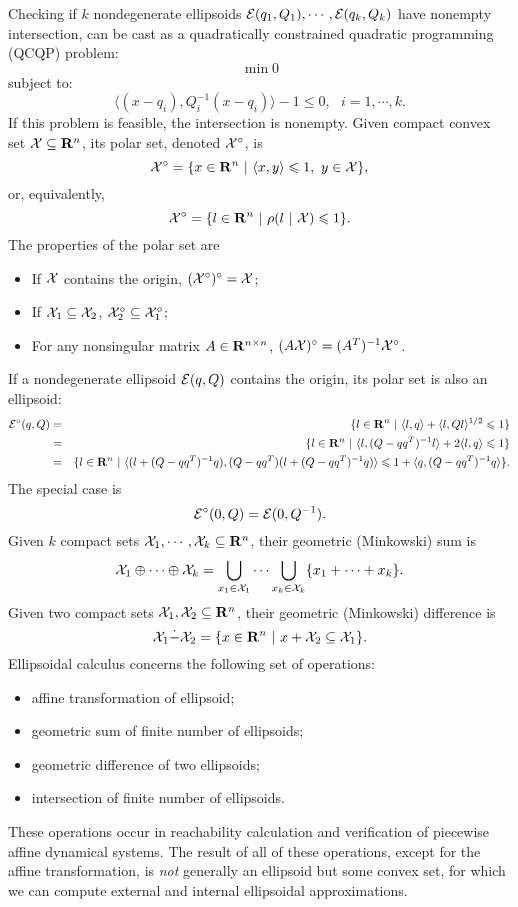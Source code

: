 Checking if $k$ nondegenerate ellipsoids $\EE(q_1,Q_1),\cdots,\EE(q_k,Q_k)$
have nonempty intersection, can be cast as a quadratically constrained
quadratic programming (QCQP) problem:
\[ \min 0 \]
subject to:
\[ \langle (x-q_i),Q_i^{-1}(x-q_i)\rangle - 1 \leq 0, ~~~ i=1,\cdots,k. \]
If this problem is feasible,  the intersection is nonempty.
\bd
Given compact convex set $\XX\subseteq{\bf R}^n$, its polar set, denoted
$\XX^\circ$, is
\[ \XX^\circ = \{x\in{\bf R}^n ~|~ \langle x,y\rangle\leq 1, ~ y\in\XX\}, \]
or, equivalently,
\[ \XX^\circ = \{l\in{\bf R}^n ~|~ \rho(l ~|~ \XX)\leq 1\}. \]
\ed
The properties of the polar set are
\begin{itemize}
\item If  $\XX$ contains the origin,  $(\XX^\circ)^\circ = \XX$;
\item If $\XX_1\subseteq\XX_2$,  $\XX_2^\circ\subseteq\XX_1^\circ$;
\item For any nonsingular matrix $A\in{\bf R}^{n\times n}$,
$(A\XX)^\circ = (A^T)^{-1}\XX^\circ$.
\end{itemize}
If a nondegenerate ellipsoid $\EE(q,Q)$ contains the origin,
 its polar set is also an ellipsoid:
\begin{eqnarray*}
\EE^\circ(q,Q) & = & \{l\in{\bf R}^n ~|~ \langle l,q\rangle +
\langle l,Ql\rangle^{1/2}\leq1 \}\\
& = & \{l\in{\bf R}^n ~|~ \langle l,(Q-qq^T)^{-1}l\rangle +
2\langle l,q\rangle\leq1 \}\\
& = & \{l\in{\bf R}^n ~|~ \langle(l+(Q-qq^T)^{-1}q),
(Q-qq^T)(l+(Q-qq^T)^{-1}q)\rangle\leq1+\langle q,(Q-qq^T)^{-1}q\rangle \}.
\end{eqnarray*}
The special case is
\[ \EE^\circ(0,Q) = \EE(0,Q^{-1}). \]
\bd
Given $k$ compact sets $\XX_1, \cdots, \XX_k\subseteq{\bf R}^n$,
their geometric (Minkowski) sum is
\begin{equation}
\XX_1\oplus\cdots\oplus\XX_k=\bigcup_{x_1\in\XX_1}\cdots\bigcup_{x_k\in\XX_k}
\{x_1 + \cdots + x_k\} .  \label{minksum}
\end{equation}
\ed
\bd
Given two compact sets $\XX_1, \XX_2 \subseteq{\bf R}^n$, their geometric
(Minkowski) difference is
\begin{equation}
\XX_1\dot{-}\XX_2 = \{x\in{\bf R}^n ~|~ x + \XX_2 \subseteq \XX_1 \}.
\label{minkdiff}
\end{equation}
\ed
Ellipsoidal calculus concerns the following set of operations:
\begin{itemize}
\item affine transformation of ellipsoid;
\item geometric sum of finite number of ellipsoids;
\item geometric difference of two ellipsoids;
\item intersection of finite number of ellipsoids.
\end{itemize}
These operations occur in reachability calculation and verification
of piecewise affine dynamical systems. The result of all of these operations,
except for the affine transformation, is \emph{not} generally an ellipsoid
but some convex set, for which we can compute external and internal ellipsoidal
approximations.

